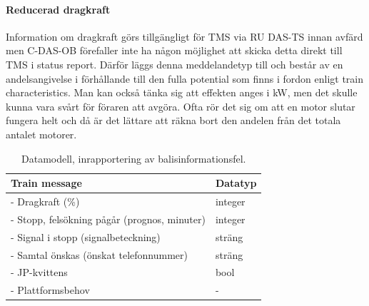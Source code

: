 \paragraph{Reducerad dragkraft}
Information om dragkraft görs tillgängligt för TMS via RU DAS-TS innan avfärd men C-DAS-OB förefaller inte ha någon möjlighet att skicka detta direkt till TMS i status report.
Därför läggs denna meddelandetyp till och består av en andelsangivelse i förhållande till den fulla potential som finns i fordon enligt train characteristics.
Man kan också tänka sig att effekten anges i kW, men det skulle kunna vara svårt för föraren att avgöra.
Ofta rör det sig om att en motor slutar fungera helt och då är det lättare att räkna bort den andelen från det totala antalet motorer.
\begin{table}[hbt!]
    \centering
    \begin{tabular}{|l|l|}
        \hline
        \color{blue}
        \textbf{Train message} & Datatyp \\
        \hline
        - Dragkraft (\%) & integer  \\
        - Stopp, felsökning pågår (prognos, minuter) & integer \\
        - Signal i stopp (signalbeteckning) & sträng \\
        - Samtal önskas (önskat telefonnummer) & sträng \\
        - JP-kvittens & bool \\
        - Plattformsbehov & - \\
        \hline
    \end{tabular}
    \caption{Datamodell, inrapportering av balisinformationsfel.}
    \label{tab:trainmessage}
\end{table}